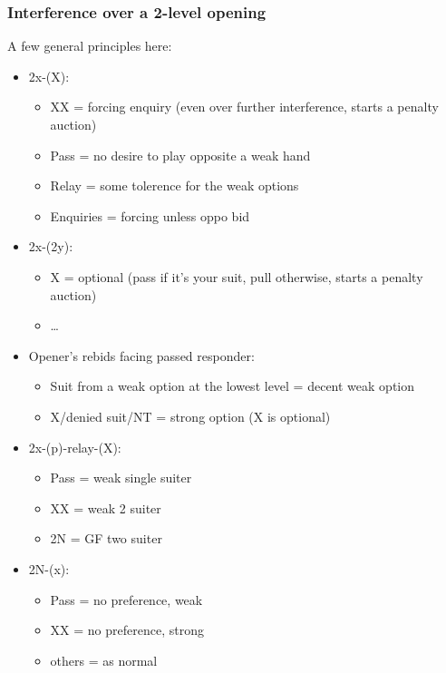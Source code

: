 \documentclass[a4paper,14pt]{extarticle}
\begin{document}
\subsubsection{Interference over a 2-level opening}
\label{sec:intf:2level}

A few general principles here:

\begin{itemize}
\item 2x-(X):
   \begin{itemize}
      \item XX = forcing enquiry (even over further interference, starts a penalty auction)
      \item Pass = no desire to play opposite a weak hand
      \item Relay = some tolerence for the weak options
      \item Enquiries = forcing unless oppo bid
   \end{itemize}
\newpage
\item 2x-(2y):
   \begin{itemize}
      \item X = optional (pass if it's your suit, pull otherwise, starts a penalty auction)
      \item \ldots
   \end{itemize}
\item Opener's rebids facing passed responder:
   \begin{itemize}
   \item Suit from a weak option at the lowest level = decent weak option
   \item X/denied suit/NT = strong option (X is optional)
   \end{itemize}
\item 2x-(p)-relay-(X):
   \begin{itemize}
	\item Pass = weak single suiter
	\item XX = weak 2 suiter
	\item 2N = GF two suiter
   \end{itemize}
\item 2N-(x):
   \begin{itemize}
	\item Pass = no preference, weak
	\item XX = no preference, strong
	\item others = as normal
   \end{itemize}
\end{itemize}
\end{document}
